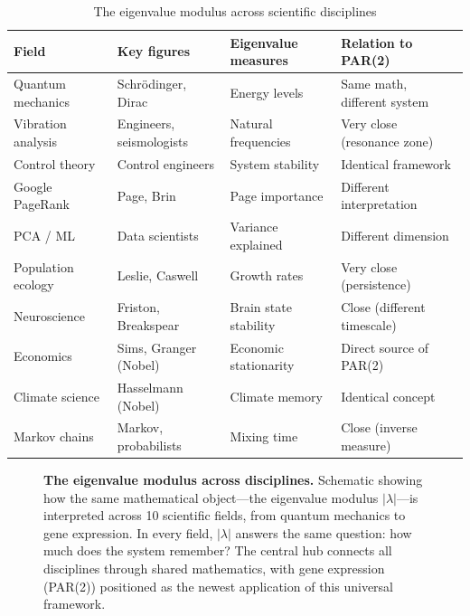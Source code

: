 \documentclass[11pt,letterpaper]{article}
\begin{document}
\begin{table}[H]
\centering
\caption{The eigenvalue modulus across scientific disciplines}
\label{tab:eigenvalue_fields}
\small
\begin{tabular}{p{3cm}p{3cm}p{3.5cm}p{3cm}}
\toprule
\textbf{Field} & \textbf{Key figures} & \textbf{Eigenvalue measures} & \textbf{Relation to PAR(2)} \\
\midrule
Quantum mechanics & Schr\"{o}dinger, Dirac & Energy levels & Same math, different system \\
Vibration analysis & Engineers, seismologists & Natural frequencies & Very close (resonance zone) \\
Control theory & Control engineers & System stability & Identical framework \\
Google PageRank & Page, Brin & Page importance \citep{page1999pagerank} & Different interpretation \\
PCA / ML & Data scientists & Variance explained & Different dimension \\
Population ecology & Leslie, Caswell & Growth rates \citep{leslie1945use} & Very close (persistence) \\
Neuroscience & Friston, Breakspear & Brain state stability & Close (different timescale) \\
Economics & Sims, Granger (Nobel) & Economic stationarity \citep{sims1980macroeconomics, granger1969investigating} & Direct source of PAR(2) \\
Climate science & Hasselmann (Nobel) & Climate memory \citep{hasselmann1976stochastic} & Identical concept \\
Markov chains & Markov, probabilists & Mixing time & Close (inverse measure) \\
\bottomrule
\end{tabular}
\end{table}

\begin{figure}[H]
\caption{\textbf{The eigenvalue modulus across disciplines.} Schematic showing how the same mathematical object---the eigenvalue modulus $|\lambda|$---is interpreted across 10 scientific fields, from quantum mechanics to gene expression. In every field, $|\lambda|$ answers the same question: how much does the system remember? The central hub connects all disciplines through shared mathematics, with gene expression (PAR(2)) positioned as the newest application of this universal framework.}
\label{fig:disciplines}
\end{figure}
\end{document}
